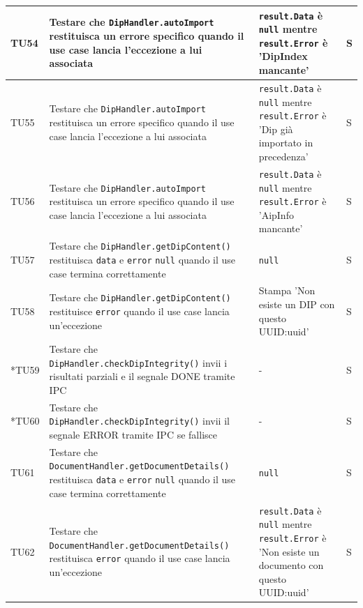 \documentclass[a4paper,12pt]{article}
\begin{document}
\begin{longtable}{|M{1.2cm}|M{5cm}|M{7cm}|M{1.5cm}|}
            TU54 & Testare che \texttt{DipHandler.autoImport} restituisca un errore specifico quando il use case lancia l'eccezione a lui associata & \texttt{result.Data} è \texttt{null} mentre \texttt{result.Error} è 'DipIndex mancante' & S \\
            \hline

            TU55 & Testare che \texttt{DipHandler.autoImport} restituisca un errore specifico quando il use case lancia l'eccezione a lui associata & \texttt{result.Data} è \texttt{null} mentre \texttt{result.Error} è 'Dip già importato in precedenza' & S \\
            \hline

            TU56 & Testare che \texttt{DipHandler.autoImport} restituisca un errore specifico quando il use case lancia l'eccezione a lui associata & \texttt{result.Data} è \texttt{null} mentre \texttt{result.Error} è 'AipInfo mancante' & S \\
            \hline

            TU57 & Testare che \texttt{DipHandler.getDipContent()} restituisca \texttt{data} e \texttt{error} \texttt{null} quando il use case termina correttamente & \texttt{null} & S \\
            \hline

            TU58 & Testare che \texttt{DipHandler.getDipContent()} restituisce \texttt{error} quando il use case lancia un'eccezione & Stampa 'Non esiste un DIP con questo UUID:uuid' & S \\
            \hline

            *TU59 & Testare che \texttt{DipHandler.checkDipIntegrity()} invii i risultati parziali e il segnale DONE tramite IPC & - & S \\
            \hline

            *TU60 & Testare che \texttt{DipHandler.checkDipIntegrity()} invii il segnale ERROR tramite IPC se fallisce & - & S \\
            \hline

            TU61 & Testare che \texttt{DocumentHandler.getDocumentDetails()} restituisca \texttt{data} e \texttt{error} \texttt{null} quando il use case termina correttamente & \texttt{null} & S \\
            \hline

            TU62 & Testare che \texttt{DocumentHandler.getDocumentDetails()} restituisca \texttt{error} quando il use case lancia un'eccezione & \texttt{result.Data} è \texttt{null} mentre \texttt{result.Error} è 'Non esiste un documento con questo UUID:uuid'  & S \\
            \hline


\end{longtable}
\end{document}
